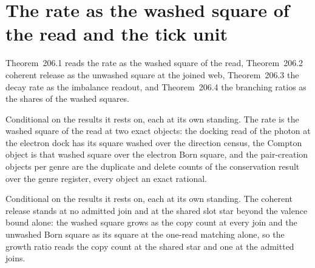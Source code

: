 \par\medskip{}\label{narr:close:9-1}\par
\section{The rate as the washed square of the read and the tick unit}\label{mod:IX-2-rate-as-the-washed-square-of-the-read-and-the-tick-unit}
\label{narr:open:9-2}Theorem~206.1 reads the rate as the washed square of the read, Theorem~206.2 coherent release as the unwashed square at the joined web, Theorem~206.3 the decay rate as the imbalance readout, and Theorem~206.4 the branching ratios as the shares of the washed squares.
\begin{chconditional}\label{box:IX-2-rate-as-the-washed-square-of-the-read-and-the-tick-unit:1}
Conditional on the results it rests on, each at its own standing. The rate is the washed square of the read at two exact objects: the docking read of the photon at the electron dock has its square washed over the direction census, the Compton object is that washed square over the electron Born square, and the pair-creation objects per genre are the duplicate and delete counts of the conservation result over the genre register, every object an exact rational.
\end{chconditional}
\begin{chconditional}\label{box:IX-2-rate-as-the-washed-square-of-the-read-and-the-tick-unit:2}
Conditional on the results it rests on, each at its own standing. The coherent release stands at no admitted join and at the shared slot star beyond the valence bound alone: the washed square grows as the copy count at every join and the unwashed Born square as its square at the one-read matching alone, so the growth ratio reads the copy count at the shared star and one at the admitted joins.
\end{chconditional}
